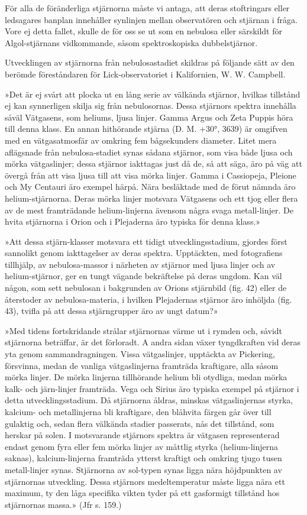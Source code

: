 \documentclass[a4paper, 12pt, oneside, swedish]{article}
\begin{document}
För alla de föränderliga stjärnorna måste vi antaga, att deras stoftringars eller ledsagares banplan innehåller synlinjen mellan observatören och stjärnan i fråga. Vore ej detta fallet, skulle de för oss se ut som en nebulosa eller särskildt för Algol-stjärnans vidkommande, såsom spektroskopiska dubbelstjärnor.

Utvecklingen av stjärnorna från nebulosastadiet skildras på följande sätt av den berömde föreståndaren för Lick-observatoriet i Kalifornien, W. W. Campbell.

»Det är ej svårt att plocka ut en lång serie av välkända stjärnor, hvilkas tillstånd ej kan synnerligen skilja sig från nebulosornas. Dessa stjärnors spektra innehålla såväl Vätgasens, som heliums, ljusa linjer. Gamma Argus och Zeta Puppis höra till denna klass. En annan hithörande stjärna (D. M. +30°, 3639) är omgifven med en vätgasatmosfär av omkring fem bågsekunders diameter. Litet mera aflägsnade från nebulosa-stadiet synas sådana stjärnor, som visa både ljusa och mörka vätgaslinjer; dessa stjärnor iakttagas just då de, så att säga, äro på väg att övergå från att visa ljusa till att visa mörka linjer. Gamma i Cassiopeja, Pleione och My Centauri äro exempel härpå. Nära besläktade med de förut nämnda äro helium-stjärnorna. Deras mörka linjer motsvara Vätgasens och ett tjog eller flera av de mest framträdande helium-linjerna ävensom några svaga metall-linjer. De hvita stjärnorna i Orion och i Plejaderna äro typiska för denna klass.»

»Att dessa stjärn-klasser motsvara ett tidigt utvecklingsstadium, gjordes först sannolikt genom iakttagelser av deras spektra. Upptäckten, med fotografiens tillhjälp, av nebulosa-massor i närheten av stjärnor med ljusa linjer och av helium-stjärnor, ger en tungt vägande bekräftelse på deras ungdom. Kan väl någon, som sett nebulosan i bakgrunden av Orions stjärnbild (fig. 42) eller de återstoder av nebulosa-materia, i hvilken Plejadernas stjärnor äro inhöljda (fig. 43), tvifla på att dessa stjärngrupper äro av ungt datum?»

»Med tidens fortskridande strålar stjärnornas värme ut i rymden och, såvidt stjärnorna beträffar, är det förloradt. A andra sidan växer tyngdkraften vid deras yta genom sammandragningen. Vissa vätgaslinjer, upptäckta av Pickering, försvinna, medan de vanliga vätgaslinjerna framträda kraftigare, alla såsom mörka linjer. De mörka linjerna tillhörande helium bli otydliga, medan mörka kalk- och järn-linjer framträda. Vega och Sirius äro typiska exempel på stjärnor i detta utvecklingsstadium. Då stjärnorna åldras, minskas vätgaslinjernas styrka, kalcium- och metallinjerna bli kraftigare, den blåhvita färgen går över till gulaktig och, sedan flera välkända stadier passerats, nås det tillstånd, som herskar på solen. I motsvarande stjärnors spektra är vätgasen representerad endast genom fyra eller fem mörka linjer av måttlig styrka (helium-linjerna saknas), kalcium-linjerna framträda ytterst kraftigt och omkring tjugo tusen metall-linjer synas. Stjärnorna av sol-typen synas ligga nära höjdpunkten av stjärnornas utveckling. Dessa stjärnors medeltemperatur måste ligga nära ett maximum, ty den låga specifika vikten tyder på ett gasformigt tillstånd hos stjärnornas massa.» (Jfr s. 159.)
\end{document}
